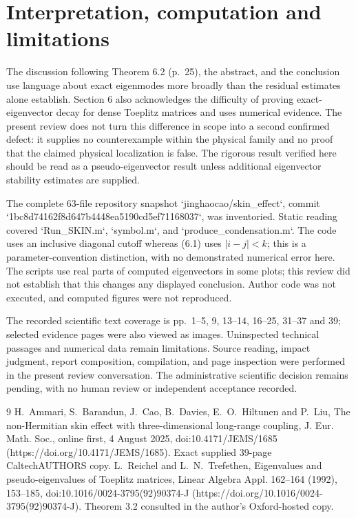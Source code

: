 \documentclass[10pt]{article}
\begin{document}
\section*{Interpretation, computation and limitations}
The discussion following Theorem 6.2 (p. 25), the abstract, and the conclusion use language about exact eigenmodes more broadly than the residual estimates alone establish. Section 6 also acknowledges the difficulty of proving exact-eigenvector decay for dense Toeplitz matrices and uses numerical evidence. The present review does not turn this difference in scope into a second confirmed defect: it supplies no counterexample within the physical family and no proof that the claimed physical localization is false. The rigorous result verified here should be read as a pseudo-eigenvector result unless additional eigenvector stability estimates are supplied.\par
The complete 63-file repository snapshot `jinghaocao/skin\_effect`, commit `1bc8d74162f8d647b4448ea5190cd5ef71168037`, was inventoried. Static reading covered `Run\_SKIN.m`, `symbol.m`, and `produce\_condensation.m`. The code uses an inclusive diagonal cutoff whereas (6.1) uses \(|i-j|<k\); this is a parameter-convention distinction, with no demonstrated numerical error here. The scripts use real parts of computed eigenvectors in some plots; this review did not establish that this changes any displayed conclusion. Author code was not executed, and computed figures were not reproduced.\par
The recorded scientific text coverage is pp. 1–5, 9, 13–14, 16–25, 31–37 and 39; selected evidence pages were also viewed as images. Uninspected technical passages and numerical data remain limitations. Source reading, impact judgment, report composition, compilation, and page inspection were performed in the present review conversation. The administrative scientific decision remains pending, with no human review or independent acceptance recorded.\par
9 H. Ammari, S. Barandun, J. Cao, B. Davies, E. O. Hiltunen and P. Liu, The non-Hermitian skin effect with three-dimensional long-range coupling, J. Eur. Math. Soc., online first, 4 August 2025, doi:10.4171/JEMS/1685 (https://doi.org/10.4171/JEMS/1685). Exact supplied 39-page CaltechAUTHORS copy. L. Reichel and L. N. Trefethen, Eigenvalues and pseudo-eigenvalues of Toeplitz matrices, Linear Algebra Appl. 162–164 (1992), 153–185, doi:10.1016/0024-3795(92)90374-J (https://doi.org/10.1016/0024-3795(92)90374-J). Theorem 3.2 consulted in the author’s Oxford-hosted copy.\par
\end{document}
